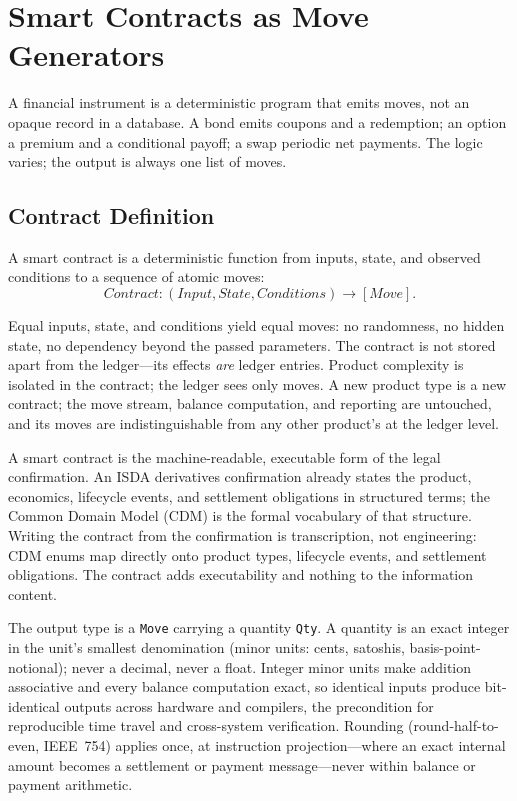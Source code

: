 \section{Smart Contracts as Move Generators}
\label{sec:sec06}
\label{sec:contracts}

A financial instrument is a deterministic program that emits moves, not an opaque record in a database. A bond emits coupons and a redemption; an option a premium and a conditional payoff; a swap periodic net payments. The logic varies; the output is always one list of moves.

\subsection{Contract Definition}

\begin{definition}
A smart contract is a deterministic function from inputs, state, and observed conditions to a sequence of atomic moves:
\[
\textit{Contract} : (\textit{Input}, \textit{State}, \textit{Conditions}) \to [\textit{Move}].
\]
\end{definition}

\noindent Equal inputs, state, and conditions yield equal moves: no randomness, no hidden state, no dependency beyond the passed parameters. The contract is not stored apart from the ledger---its effects \emph{are} ledger entries. Product complexity is isolated in the contract; the ledger sees only moves. A new product type is a new contract; the move stream, balance computation, and reporting are untouched, and its moves are indistinguishable from any other product's at the ledger level.

A smart contract is the machine-readable, executable form of the legal confirmation. An ISDA derivatives confirmation already states the product, economics, lifecycle events, and settlement obligations in structured terms; the Common Domain Model (CDM) is the formal vocabulary of that structure. Writing the contract from the confirmation is transcription, not engineering: CDM enums map directly onto product types, lifecycle events, and settlement obligations. The contract adds executability and nothing to the information content.

The output type is a \texttt{Move} carrying a quantity \texttt{Qty}. A quantity is an exact integer in the unit's smallest denomination (minor units: cents, satoshis, basis-point-notional); never a decimal, never a float. Integer minor units make addition associative and every balance computation exact, so identical inputs produce bit-identical outputs across hardware and compilers, the precondition for reproducible time travel and cross-system verification. Rounding (round-half-to-even, IEEE~754) applies once, at instruction projection---where an exact internal amount becomes a settlement or payment message---never within balance or payment arithmetic.

